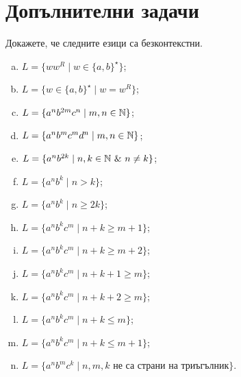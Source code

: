 \section{Допълнителни задачи}

\begin{problem}
  Докажете, че следните езици са безконтекстни.
  \begin{enumerate}[a)]
  \item
    $L = \{ww^R \mid w \in \{a,b\}^\star\}$;
  \item
    $L = \{w \in \{a,b\}^\star \mid w = w^R\}$;
  \item
    $L = \{a^nb^{2m}c^{n} \mid m,n \in \mathbb{N}\}$;
  \item
    $L = \{a^nb^{m}c^{m}d^n \mid m,n \in \mathbb{N}\}$;
  \item
    $L = \{a^nb^{2k} \mid n,k \in \Nat\ \&\ n \neq k\}$;
  \item
    $L = \{a^nb^k \mid n > k\}$;
  \item
    $L = \{a^nb^k \mid n \geq 2k\}$;
  \item
    $L = \{a^nb^kc^m \mid n + k \geq m+1\}$;
  \item
    $L = \{a^nb^kc^m \mid n + k \geq m+2\}$;
  \item
    $L = \{a^nb^kc^m \mid n + k + 1 \geq m\}$;
  \item
    $L = \{a^nb^kc^m \mid n + k + 2 \geq m\}$;
  \item
    $L = \{a^nb^kc^m \mid n + k \leq m\}$;
  \item
    $L = \{a^nb^kc^m \mid n + k \leq m+1\}$;
  \item
    $L = \{a^nb^mc^k \mid n, m, k \text{ не са страни на триъгълник}\}$.

\end{enumerate}
\end{problem}
